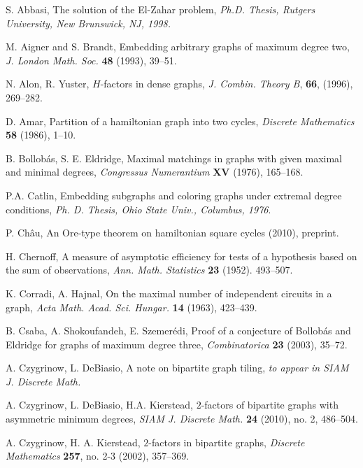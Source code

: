 \documentclass[oneside,12pt]{memoir}
\begin{document}
\begin{thebibliography}{99}
\SingleSpacing


 S. Abbasi, The solution of the El-Zahar problem, \emph{Ph.D. Thesis, Rutgers University, New Brunswick, NJ, 1998.}

  M. Aigner and S. Brandt, Embedding arbitrary graphs of maximum
degree two, \emph{J. London Math. Soc.} \textbf{48} (1993), 39--51.

 N. Alon, R. Yuster, $H$-factors in dense graphs, \emph{J. Combin. Theory B}, \textbf{66}, (1996), 269--282.

 D. Amar, Partition of a hamiltonian graph into two cycles, \emph{Discrete Mathematics} \textbf{58} (1986), 1--10.

 B. Bollob\'as, S. E. Eldridge,
Maximal matchings in graphs with given maximal and minimal
degrees,  \emph{Congressus Numerantium}  \textbf{XV} (1976),  165--168.

 P.A. Catlin, Embedding subgraphs and coloring graphs under extremal degree conditions, \emph{Ph. D. Thesis, Ohio State Univ., Columbus, 1976}.

P. Ch\^au, An Ore-type theorem on hamiltonian square cycles
(2010), preprint. %

 H. Chernoff, A measure of asymptotic efficiency for tests of a hypothesis based on the sum of observations, \emph{Ann. Math. Statistics} \textbf{23} (1952). 493--507. 

 K. Corradi, A. Hajnal, On the maximal number of independent circuits in a graph, \emph{Acta Math. Acad. Sci. Hungar.} \textbf{14} (1963), 423--439. 


 B. Csaba, A. Shokoufandeh, E. Szemer\'edi,  Proof of a conjecture of Bollob\'as and Eldridge for graphs of maximum degree three, \emph{Combinatorica} \textbf{23} (2003), 35--72.

 A. Czygrinow, L. DeBiasio, A note on bipartite graph tiling, \emph{to appear in SIAM J. Discrete Math.}

 A. Czygrinow, L. DeBiasio, H.A. Kierstead, $2$-factors of bipartite graphs with asymmetric minimum degrees, \emph{SIAM J. Discrete Math.} \textbf{24} (2010), no. 2, 486--504. 

 A. Czygrinow, H. A. Kierstead, $2$-factors in bipartite graphs, 
\emph{Discrete Mathematics} \textbf{257}, no. 2-3 (2002), 357--369.


\end{thebibliography}
\end{document}
